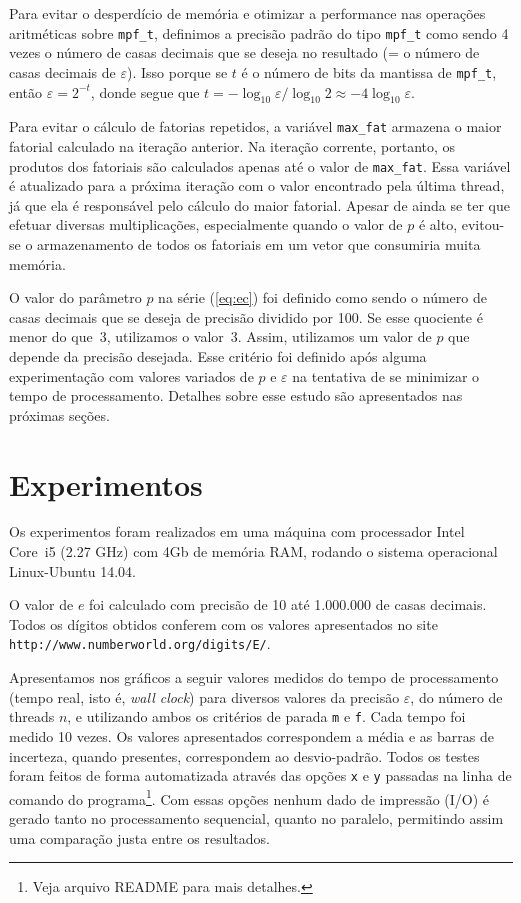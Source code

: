 \documentclass[12pt]{article}
\begin{document}
Para evitar o desperdício de memória e otimizar a performance nas operações aritméticas sobre 
\verb|mpf_t|, definimos a precisão padrão do tipo \verb|mpf_t| como sendo 4 vezes o número de casas 
decimais que se deseja no resultado (= o número de casas decimais de $\varepsilon$). Isso porque se 
$t$ é o número de bits da mantissa de \verb|mpf_t|, então $\varepsilon = 2^{-t}$, donde segue que 
$t = - \log_{10} \varepsilon / \log_{10} 2 \approx - 4 \log_{10} \varepsilon$.

Para evitar o cálculo de fatorias repetidos, a variável \verb|max_fat| armazena o maior fatorial 
calculado na iteração anterior. Na iteração corrente, portanto, os produtos dos fatoriais são 
calculados apenas até o valor de \verb|max_fat|. Essa variável é atualizado para a próxima iteração 
com o valor encontrado pela última thread, já que ela é responsável pelo cálculo do maior fatorial.
Apesar de ainda se ter que efetuar diversas multiplicações, especialmente quando o valor de $p$ é 
alto, evitou-se o armazenamento de todos os fatoriais em um vetor que consumiria muita memória. 

O valor do parâmetro $p$ na série (\ref{eq:ec}) foi definido como sendo o número de casas decimais 
que se deseja de precisão dividido por 100. Se esse quociente é menor do que~3, utilizamos o 
valor~3. Assim, utilizamos um valor de $p$ que depende da precisão desejada. Esse critério foi 
definido após alguma experimentação com valores variados de $p$ e $\varepsilon$ na tentativa de se 
minimizar o tempo de processamento. Detalhes sobre esse estudo são apresentados nas próximas seções.  


\section{Experimentos}

Os experimentos foram realizados em uma máquina com processador Intel Core~i5 (2.27 GHz) com 4Gb de 
memória RAM, rodando o sistema operacional Linux-Ubuntu 14.04.

O valor de $e$ foi calculado com precisão de 10 até 1.000.000 de casas decimais. Todos os dígitos 
obtidos conferem com os valores apresentados no site \verb|http://www.numberworld.org/digits/E/|.

Apresentamos nos gráficos a seguir valores medidos do tempo de processamento (tempo real, isto é, 
{\it wall clock}) para diversos valores da precisão $\varepsilon$, do número de threads $n$, e 
utilizando ambos os critérios de parada \verb|m| e \verb|f|. Cada tempo foi medido 10 vezes. Os 
valores apresentados correspondem a média e as barras de incerteza, quando presentes, correspondem 
ao desvio-padrão. Todos os testes foram feitos de forma automatizada através das opções \verb|x| e
\verb|y| passadas na linha de comando do programa\footnote{Veja arquivo README para mais 
detalhes.}. Com essas opções nenhum dado de impressão (I/O) é gerado tanto no processamento 
sequencial, quanto no paralelo, permitindo assim uma comparação justa entre os resultados.  
\end{document}
